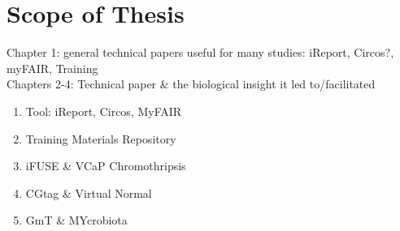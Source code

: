 \chapter*{Scope of Thesis}

Chapter 1: general technical papers useful for many studies: iReport, Circos?, myFAIR, Training \\
Chapters 2-4: Technical paper \& the biological insight it led to/facilitated \\

\begin{enumerate}
    \item Tool: iReport, Circos, MyFAIR
    \item Training Materials Repository
    \item iFUSE \& VCaP Chromothripsis
    \item CGtag \& Virtual Normal
    \item GmT \& MYcrobiota
\end{enumerate}
